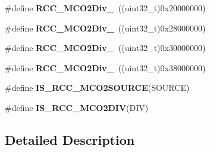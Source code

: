 \begin{DoxyCompactItemize}
\item 
\hypertarget{group___r_c_c___m_c_o2___clock___source___prescaler_gac64afcfec90f2783fd78887e8a783ecb}{\#define {\bfseries R\-C\-C\-\_\-\-M\-C\-O2\-Div\-\_}~((uint32\-\_\-t)0x20000000)}\label{group___r_c_c___m_c_o2___clock___source___prescaler_gac64afcfec90f2783fd78887e8a783ecb}

\item 
\hypertarget{group___r_c_c___m_c_o2___clock___source___prescaler_gad94c96c38025e6a5164bc277d87173a6}{\#define {\bfseries R\-C\-C\-\_\-\-M\-C\-O2\-Div\-\_}~((uint32\-\_\-t)0x28000000)}\label{group___r_c_c___m_c_o2___clock___source___prescaler_gad94c96c38025e6a5164bc277d87173a6}

\item 
\hypertarget{group___r_c_c___m_c_o2___clock___source___prescaler_ga3ff14a7e8bb898eadf24d879ee41069f}{\#define {\bfseries R\-C\-C\-\_\-\-M\-C\-O2\-Div\-\_}~((uint32\-\_\-t)0x30000000)}\label{group___r_c_c___m_c_o2___clock___source___prescaler_ga3ff14a7e8bb898eadf24d879ee41069f}

\item 
\hypertarget{group___r_c_c___m_c_o2___clock___source___prescaler_gac47804a0bf27b079a23dd532d5482cf9}{\#define {\bfseries R\-C\-C\-\_\-\-M\-C\-O2\-Div\-\_}~((uint32\-\_\-t)0x38000000)}\label{group___r_c_c___m_c_o2___clock___source___prescaler_gac47804a0bf27b079a23dd532d5482cf9}

\item 
\#define {\bfseries I\-S\-\_\-\-R\-C\-C\-\_\-\-M\-C\-O2\-S\-O\-U\-R\-C\-E}(S\-O\-U\-R\-C\-E)
\item 
\#define {\bfseries I\-S\-\_\-\-R\-C\-C\-\_\-\-M\-C\-O2\-D\-I\-V}(D\-I\-V)
\end{DoxyCompactItemize}


\subsection{Detailed Description}


